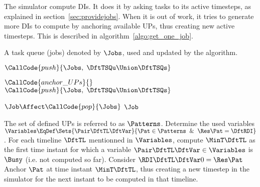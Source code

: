 The simulator compute DIs. It does it by asking tasks to its active timesteps, as explained in section~\ref{sec:providejobs}. When it is out of work, it tries to generate more DIs to compute by anchoring available UPs, thus creating new active timesteps. This is described in algorithm~\ref{algo:get_one_job}.
\begin{algorithm}
  \caption{$\CallCode{get\_one\_job}{}$ \label{algo:get_one_job}}
  \begin{algorithmic}[1]
    \REQUIRE A task queue (jobs) denoted by $\Jobs$, used and updated by the algorithm.
    \IF{$\Jobs = \emptyset$}
    \STATE {}
    
    \IF{$\Status\DftTS \in \Set{\Relaxing, \Checking}$}
    \STATE $\CallCode{push}{\Jobs, \; \DftTSQu \Union \DftTSQs}$ 
    \ENDIF
    \ENDFOR
    
    \IF{$\Jobs = \emptyset$}
    \STATE {}
    \STATE {}
    \STATE $\CallCode{anchor\_UPs}{}$ 
    \STATE {}
    \IF{$\Status\DftTS \in \Set{\Relaxing, \Checking}$}
    \STATE $\CallCode{push}{\Jobs, \; \DftTSQu \Union \DftTSQs}$ 
    \ENDIF
    \ENDFOR
    \ENDIF

    
    \ENDIF
    \IF{$\Jobs = \emptyset$}
    \RETURN {}
    \ELSE
    \STATE $\Job \Affect \CallCode{pop}{\Jobs}$
    \RETURN $\Job$ 
    \ENDIF
  \end{algorithmic}
\end{algorithm}

\begin{algorithm}
  \caption{$\CallCode{anchor\_UPs}{}$ \label{algo:anchor}}
  \begin{algorithmic}[1]
    \REQUIRE The set of defined UPs is referred to as $\Patterns$.
    \STATE Determine the used variables $\Variables \EqDef \Sets{\Pair\DftTL\DftVar}{\Pat\in\Patterns\And\Res\Pat=\DftRDI}$.
    \STATE For each timeline $\DftTL$ mentionned in $\Variables$, compute $\MinT\DftTL$ as the first time instant for which a variable $\Pair\DftTL\DftVar \in \Variables$ is $\Busy$ (i.e. not computed so far).
    \FORALL{$\Pat \in \Patterns$}
    \STATE Consider $\RDI\DftTL\DftVar 0 = \Res\Pat$
    \IF{$\Status{\DI\DftTL\DftVar{\MinT\DftTL} = \Busy}$}
    \STATE Anchor $\Pat$ at time instant $\MinT\DftTL$, thus creating a new timestep in the simulator for the next instant to be computed in that timeline.
    \ELSE
    \STATE {}
    \ENDIF
    \ENDFOR
  \end{algorithmic}
\end{algorithm}


